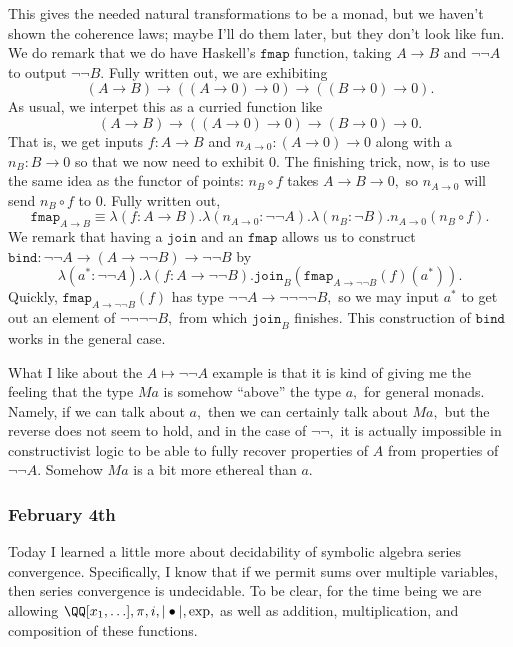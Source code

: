 This gives the needed natural transformations to be a monad, but we haven't shown the coherence laws; maybe I'll do them later, but they don't look like fun. We do remark that we do have Haskell's $\texttt{fmap}$ function, taking $A\to B$ and $\lnot\lnot A$ to output $\lnot\lnot B.$ Fully written out, we are exhibiting
\[(A\to B)\to((A\to0)\to0)\to((B\to0)\to0).\]
As usual, we interpet this as a curried function like
\[(A\to B)\to((A\to0)\to0)\to(B\to0)\to0.\]
That is, we get inputs $f:A\to B$ and $n_{A\to0}:(A\to0)\to0$ along with a $n_B:B\to0$ so that we now need to exhibit $0.$ The finishing trick, now, is to use the same idea as the functor of points: $n_B\circ f$ takes $A\to B\to 0,$ so $n_{A\to0}$ will send $n_B\circ f$ to $0.$ Fully written out,
\[\texttt{fmap}_{A\to B}\equiv\lambda(f:A\to B).\lambda(n_{A\to0}:\lnot\lnot A).\lambda(n_B:\lnot B).n_{A\to0}(n_B\circ f).\]
We remark that having a $\texttt{join}$ and an $\texttt{fmap}$ allows us to construct $\texttt{bind}:\lnot\lnot A\to(A\to\lnot\lnot B)\to\lnot\lnot B$ by
\[\lambda(a^*:\lnot\lnot A).\lambda(f:A\to\lnot\lnot B).\texttt{join}_B\left(\texttt{fmap}_{A\to\lnot\lnot B}(f)(a^*)\right).\]
Quickly, $\texttt{fmap}_{A\to\lnot\lnot B}(f)$ has type $\lnot\lnot A\to\lnot\lnot\lnot\lnot B,$ so we may input $a^*$ to get out an element of $\lnot\lnot\lnot\lnot B,$ from which $\texttt{join}_B$ finishes. This construction of $\texttt{bind}$ works in the general case.

What I like about the $A\mapsto\lnot\lnot A$ example is that it is kind of giving me the feeling that the type $Ma$ is somehow ``above'' the type $a,$ for general monads. Namely, if we can talk about $a,$ then we can certainly talk about $Ma,$ but the reverse does not seem to hold, and in the case of $\lnot\lnot,$ it is actually impossible in constructivist logic to be able to fully recover properties of $A$ from properties of $\lnot\lnot A.$ Somehow $Ma$ is a bit more ethereal than $a.$

\subsubsection{February 4th}
Today I learned a little more about decidability of symbolic algebra series convergence. Specifically, I know that if we permit sums over multiple variables, then series convergence is undecidable. To be clear, for the time being we are allowing $\QQ[x_1,\ldots],\pi,i,|\bullet|,\exp,$ as well as addition, multiplication, and composition of these functions.

